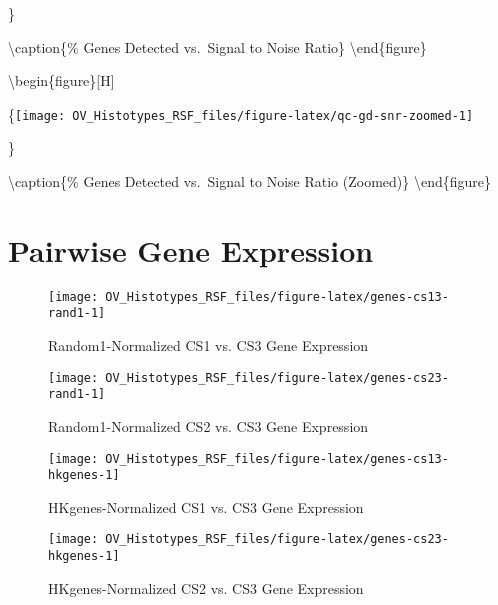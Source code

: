 \documentclass[
]{report}
\begin{document}
\}

\textbackslash caption\{\% Genes Detected vs.~Signal to Noise Ratio\}\label{fig:qc-gd-snr-all}
\textbackslash end\{figure\}

\textbackslash begin\{figure\}{[}H{]}

\{\centering \texttt{[image: OV\_Histotypes\_RSF\_files/figure-latex/qc-gd-snr-zoomed-1]}

\}

\textbackslash caption\{\% Genes Detected vs.~Signal to Noise Ratio (Zoomed)\}\label{fig:qc-gd-snr-zoomed}
\textbackslash end\{figure\}

\hypertarget{pairwise-gene-expression}{%
\section{Pairwise Gene Expression}\label{pairwise-gene-expression}}

\begin{figure}[H]

{\centering \texttt{[image: OV\_Histotypes\_RSF\_files/figure-latex/genes-cs13-rand1-1]} 

}

\caption{Random1-Normalized CS1 vs. CS3 Gene Expression}\label{fig:genes-cs13-rand1}
\end{figure}

\begin{figure}[H]

{\centering \texttt{[image: OV\_Histotypes\_RSF\_files/figure-latex/genes-cs23-rand1-1]} 

}

\caption{Random1-Normalized CS2 vs. CS3 Gene Expression}\label{fig:genes-cs23-rand1}
\end{figure}

\begin{figure}[H]

{\centering \texttt{[image: OV\_Histotypes\_RSF\_files/figure-latex/genes-cs13-hkgenes-1]} 

}

\caption{HKgenes-Normalized CS1 vs. CS3 Gene Expression}\label{fig:genes-cs13-hkgenes}
\end{figure}

\begin{figure}[H]

{\centering \texttt{[image: OV\_Histotypes\_RSF\_files/figure-latex/genes-cs23-hkgenes-1]} 

}

\caption{HKgenes-Normalized CS2 vs. CS3 Gene Expression}\label{fig:genes-cs23-hkgenes}
\end{figure}
\end{document}
